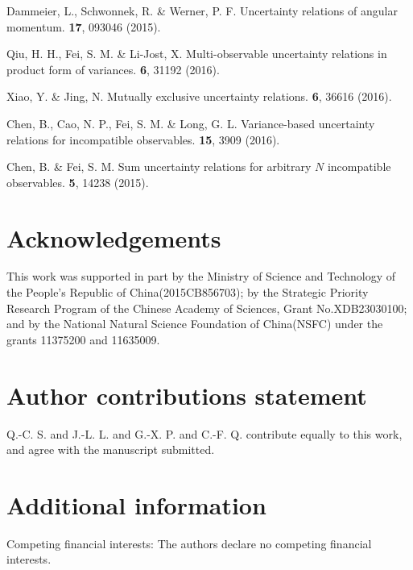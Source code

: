 \documentclass[fleqn,10pt]{wlscirep}
\begin{document}
\begin{thebibliography}{10}
 Dammeier, L.,  Schwonnek, R. \& Werner, P. F.
\newblock  Uncertainty relations of angular momentum.
 {\bf 17}, 093046 (2015).

 Qiu, H. H., Fei, S. M. \& Li-Jost, X.
\newblock Multi-observable uncertainty relations in product form of variances.
 {\bf 6}, 31192 (2016).

 Xiao, Y. \& Jing, N.
\newblock Mutually exclusive uncertainty relations.
 {\bf 6}, 36616 (2016).

 Chen, B., Cao, N. P.,  Fei, S. M. \& Long, G. L.
\newblock Variance-based uncertainty relations for incompatible observables.
 {\bf 15}, 3909 (2016).

 Chen, B. \& Fei, S. M.
\newblock Sum uncertainty relations for arbitrary $N$ incompatible observables.
 {\bf 5}, 14238 (2015).

\end{thebibliography}



\section*{Acknowledgements}
This work was supported in part by the Ministry of Science and Technology of the People's Republic of China(2015CB856703); by the Strategic Priority Research Program of the Chinese Academy of Sciences, Grant No.XDB23030100; and by the National Natural Science Foundation of China(NSFC) under the grants 11375200 and 11635009.

\section*{Author contributions statement}
Q.-C. S. and J.-L. L. and G.-X. P. and C.-F. Q. contribute equally to this work, and agree with the manuscript submitted.

\section*{Additional information}
Competing financial interests: The authors declare no competing financial interests.
\end{document}
